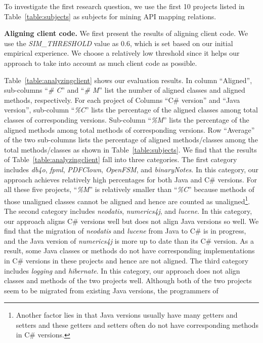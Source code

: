 To investigate the first research question, we use the first 10 projects
listed in Table~\ref{table:subjects} as subjects for mining API mapping relations.

\textbf{Aligning client code.}
We first present the results of aligning client code.
We use the \emph{SIM\_THRESHOLD} value as 0.6, which is set based on our initial
empirical experience. We choose a relatively low threshold since it helps our
approach to take into account as much client code as possible.

Table~\ref{table:analyzingclient} shows our evaluation results.
In column ``Aligned'', sub-columns ``\emph{\# C}'' and
``\emph{\# M}'' list the number of aligned classes and aligned methods, respectively.
For each project of Columns ``C\# version'' and ``Java version'', sub-column ``\emph{\%C}'' lists the
percentage of the aligned classes among total classes of
corresponding versions. Sub-column ``\emph{\%M}'' lists the
percentage of the aligned methods among total methods of
corresponding versions. Row ``Average'' of the two sub-columns lists
the percentage of aligned methods/classes among the total
methods/classes as shown in Table~\ref{table:subjects}. We find that
the results of Table~\ref{table:analyzingclient} fall into three
categories. The first category includes \emph{db4o}, \emph{fpml},
\emph{PDFClown}, \emph{OpenFSM}, and \emph{binaryNotes}. In this category, our
approach achieves relatively high percentages for both Java
and C\# versions. For all these five projects, ``\emph{\%M}'' is
relatively smaller than ``\emph{\%C}'' because methods of those
unaligned classes cannot be aligned and hence are counted as
unaligned\footnote{Another factor lies in that Java versions usually
have many getters and setters and these getters and setters often do
not have corresponding methods in C\# versions.}. The second
category includes \emph{neodatis}, \emph{numerics4j}, and
\emph{lucene}. In this category, our approach aligns C\# versions well but does
not align Java versions so well. We find that the migration of \emph{neodatis} and
\emph{lucene} from Java to C\# is in progress, and the
Java version of \emph{numerics4j} is more up to date than its
C\# version. As a result, some Java classes or methods do not have
corresponding implementations in C\# versions in these projects and
hence are not aligned. The third category includes \emph{logging}
and \emph{hibernate}. In this category, our approach does not align classes and
methods of the two projects well. Although both of the two projects
seem to be migrated from existing Java versions, the programmers of
